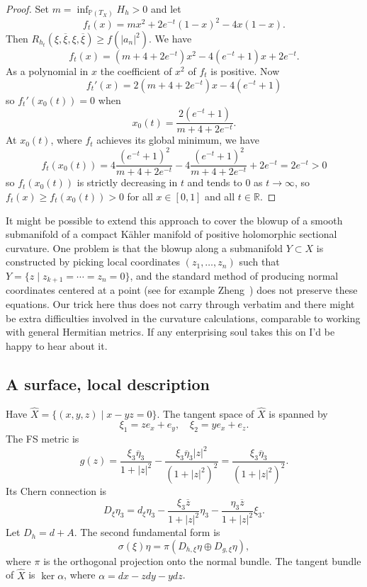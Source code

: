 \documentclass[10pt,a4paper]{amsart}
\newcommand{\kk}[1]{\mathbb{#1}}
\def\ov#1{\overline{#1}}
\def\hsc{holomorphic sectional curvature}
\def\bl#1{\widehat{#1}}
\def\blX{\bl{X}}
\begin{document}
\begin{proof}
Set $m = \inf_{\kk P(T_X)} H_h > 0$ and let
$$
f_t(x) = m x^2 + 2 e^{-t} (1-x)^2 - 4x(1-x).
$$
Then $R_{h_t}(\xi, \ov\xi, \xi, \ov\xi) \geq f(|a_n|^2)$.
We have
$$
f_t(x)
= (m + 4 + 2e^{-t})x^2 - 4(e^{-t} + 1)x + 2e^{-t}.
$$
As a polynomial in $x$ the coefficient of $x^2$ of $f_t$ is positive.
Now
$$
f_t'(x)
= 2(m + 4 + 2e^{-t})x - 4(e^{-t} + 1)
$$
so $f_t'(x_0(t)) = 0$ when
$$
x_0(t) = \frac{2(e^{-t} + 1)}{m + 4 + 2e^{-t}}.
$$
At $x_0(t)$, where $f_t$ achieves its global minimum, we have
$$
f_t(x_0(t))
=
4 \frac{(e^{-t} + 1)^2}{m + 4 + 2e^{-t}}
- 4 \frac{(e^{-t} + 1)^2}{m + 4 + 2e^{-t}}
+ 2e^{-t}
= 2e^{-t} > 0
$$
so $f_t(x_0(t))$ is strictly decreasing in $t$ and tends to $0$ as $t \to
\infty$, so $f_t(x) \geq f_t(x_0(t)) > 0$ for all $x \in [0,1]$ and all $t \in
\kk R$.
\end{proof}




It might be possible to extend this approach to cover the blowup of a smooth
submanifold of a compact K\"ahler manifold of positive \hsc.
One problem
is that the blowup along a submanifold $Y \subset X$ is
constructed by picking local coordinates $(z_1,\ldots,z_n)$ such that $Y = \{z
\mid z_{k+1} = \cdots = z_n = 0\}$,
and the standard method of producing normal coordinates centered at a point
(see for example Zheng~\cite{zheng2000complex})
does not preserve these equations.
Our trick here thus does not carry through verbatim and there might be extra
difficulties involved in the curvature calculations, comparable to working
with general Hermitian metrics.
If any enterprising soul takes this on I'd be happy to hear about it.





\subsection*{A surface, local description}

Have $\blX = \{(x,y,z) \mid x - y z = 0\}$.
The tangent space of $\blX$ is spanned by
$$
\xi_1 = z e_x + e_y,
\quad
\xi_2 = y e_x + e_z.
$$
The FS metric is
$$
g(z)
= \frac{\xi_3 \ov\eta_3}{1 + |z|^2}
- \frac{\xi_3 \ov \eta_3 |z|^2}{(1 + |z|^2)^2}
= \frac{\xi_3 \ov\eta_3}{(1 + |z|^2)^2}.
$$
Its Chern connection is
$$
D_\xi \eta_3
= d_\xi \eta_3 - \frac{\xi_3 \ov z}{1 + |z|^2} \eta_3
- \frac{\eta_3 \ov z}{1 + |z|^2} \xi_3.
$$
Let $D_h = d + A$.
The second fundamental form is
$$
\sigma(\xi) \eta
= \pi(D_{h,\xi} \eta \oplus D_{g,\xi} \eta),
$$
where $\pi$ is the orthogonal projection onto the normal bundle.
The tangent bundle of $\blX$ is $\ker \alpha$, where
$\alpha = dx - z dy - y dz$.
\end{document}
